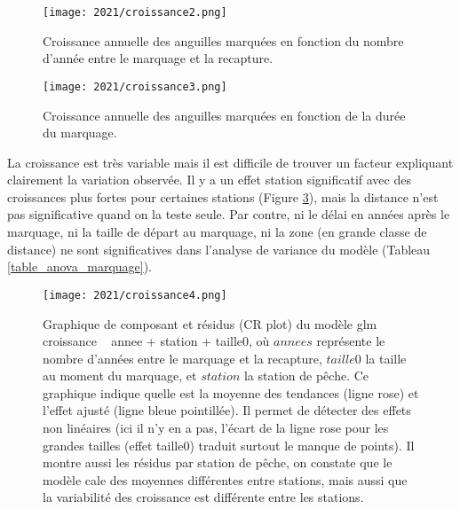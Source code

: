 \documentclass[10pt,twocolumn,titlepage,twoside]{article}\usepackage[]{graphicx}\usepackage[]{color}
\begin{document}
\begin{figure}[htbp]
\centering
\texttt{[image: 2021/croissance2.png]}
\caption[Croissance annuelles des anguilles marquées]{Croissance annuelle des
anguilles marquées en fonction du nombre d'année entre le marquage et la
recapture.}
\label{croissance2}
\end{figure}


\begin{figure}[htbp]
\centering
\texttt{[image: 2021/croissance3.png]}
\caption[Croissance annuelles des anguilles marquées]{Croissance annuelle des
anguilles marquées en fonction de la durée du marquage.}
\label{croissance3}
\end{figure}


La croissance est très variable mais il est difficile de trouver un facteur
expliquant clairement la variation observée. Il y a un effet station significatif avec des croissances plus fortes
pour certaines stations (Figure \ref{croissance4}), mais la distance n'est pas significative
quand on la teste seule. Par contre, ni le délai en années après le
marquage, ni la taille de départ au marquage, ni la zone (en grande
classe de distance) ne sont significatives dans l'analyse de variance du
modèle (Tableau \ref{table_anova_marquage}). 



\begin{figure}[htbp]
\centering
\texttt{[image: 2021/croissance4.png]}
\caption[Graphique de composant et résidus du modèle glm croissance ~ annee +
station + taille initiale.]{Graphique de composant et résidus (CR plot) du
modèle glm croissance ~ annee + station + taille0, où $annees$ représente le
nombre d'années entre le marquage et la recapture, $taille0$ la taille au moment
du marquage, et $station$ la station de pêche. Ce graphique indique quelle est la
moyenne des tendances (ligne rose) et l'effet ajusté (ligne bleue
pointillée).
Il permet de détecter des effets non linéaires (ici il n'y en a pas, l'écart de
la ligne rose pour les grandes tailles
(effet taille0) traduit surtout le manque de points). Il montre aussi les
résidus par station de pêche, on constate que le modèle cale des moyennes différentes entre
stations, mais aussi que la variabilité des croissance est différente entre les
stations.}
\label{croissance4}
\end{figure}


\end{document}
